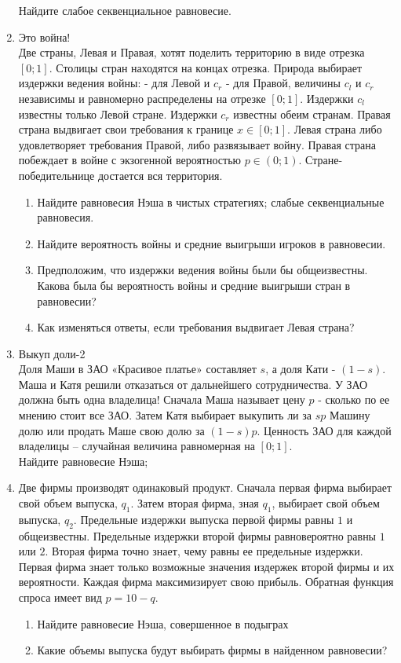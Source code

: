 \documentclass[pdftex,12pt,a4paper]{article}
\begin{document}
\begin{enumerate}
Найдите слабое секвенциальное равновесие.

\item Это война!\\
Две страны, Левая и Правая, хотят поделить территорию в виде отрезка $\left[ {0;1} \right]$. Столицы стран находятся на концах отрезка. Природа выбирает издержки ведения войны:  - для Левой и $c_r $ - для Правой, величины $c_l $ и $c_r $ независимы и равномерно распределены на отрезке $\left[ {0;1} \right]$. Издержки $c_l $ известны только Левой стране. Издержки $c_r $ известны обеим странам. Правая страна выдвигает свои требования к границе $x \in \left[ {0;1} \right]$. Левая страна либо удовлетворяет требования Правой, либо развязывает войну. Правая страна побеждает в войне с экзогенной вероятностью $p \in \left( {0;1} \right)$. Стране-победительнице достается вся территория.\\
\begin{enumerate}
\item Найдите равновесия Нэша в чистых стратегиях; слабые секвенциальные равновесия.
\item Найдите вероятность войны и средние выигрыши игроков в равновесии.
\item Предположим, что издержки ведения войны были бы общеизвестны. Какова была бы вероятность войны и средние выигрыши стран в равновесии?
\item Как изменяться ответы, если требования выдвигает Левая страна?
\end{enumerate}

\item Выкуп доли-2\\
Доля Маши в ЗАО «Красивое платье» составляет $s$, а доля Кати - $\left( {1 - s} \right)$. Маша и Катя решили отказаться от дальнейшего сотрудничества. У ЗАО должна быть одна владелица! Сначала Маша называет цену $p$ - сколько по ее мнению стоит все ЗАО. Затем Катя выбирает выкупить ли за $sp$ Машину долю или продать Маше свою долю за $\left( {1 - s} \right)p$. 
Ценность ЗАО для каждой владелицы – случайная величина равномерная на $\left[ {0;1} \right]$.\\
Найдите равновесие Нэша;

\item Две фирмы производят одинаковый продукт. Сначала первая фирма выбирает свой объем выпуска, $q_1$. Затем вторая фирма, зная $q_1$, выбирает свой объем выпуска, $q_2$. Предельные издержки выпуска первой фирмы равны $1$ и общеизвестны. Предельные издержки второй фирмы равновероятно равны $1$ или $2$. Вторая фирма точно знает, чему равны ее предельные издержки. Первая фирма знает только возможные значения издержек второй фирмы и их вероятности. Каждая фирма максимизирует свою прибыль. Обратная функция спроса имеет вид $p=10-q$. 
\begin{enumerate}
\item Найдите равновесие Нэша, совершенное в подыграх
\item Какие объемы выпуска будут выбирать фирмы в найденном равновесии?
\end{enumerate}

\end{enumerate}
\end{document}
